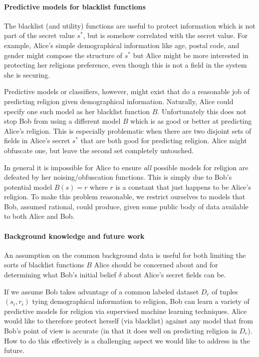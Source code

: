 \documentclass{article} %
\newcommand{\asecret}[0]{s}
\newcommand{\rsecret}[0]{\asecret^*}
\theoremstyle{plain} %
\theoremstyle{definition} %
\begin{document}
\paragraph*{Predictive models for blacklist functions} The blacklist
(and utility) functions are useful to protect information which is not
part of the secret value $ \rsecret $, but is somehow correlated with
the secret value. For example, Alice's simple demographical
information like age, postal code, and gender might compose the
structure of $ \rsecret $ but Alice might be more interested in
protecting her religions preference, even though this is not a field
in the system she is securing.

Predictive models or classifiers, however, might exist that do a
reasonable job of predicting religion given demographical
information. Naturally, Alice could specify one such model as her
blacklist function $ B $. Unfortunately this does not stop Bob from
using a different model $ B $ which is as good or better at predicting
Alice's religion. This is especially problematic when there are two
disjoint sets of fields in Alice's secret $ \rsecret $ that are both
good for predicting religion. Alice might obfuscate one, but leave the
second set completely untouched.

In general it is impossible for Alice to ensure \emph{all} possible
models for religion are defeated by her noising/obfuscation
functions. This is simply due to Bob's potential model $ B(s) = r $
where $ r $ is a constant that just happens to be Alice's religion. To
make this problem reasonable, we restrict ourselves to models that
Bob, assumed rational, could produce, given some public body of data
available to both Alice and Bob.

\paragraph*{Background knowledge and future work} An assumption on the common
background data is useful for both limiting the sorts of blacklist
functions $ B $ Alice should be concerned about and for determining
what Bob's initial belief $ \delta $ about Alice's secret fields can
be.

If we assume Bob takes advantage of a common labeled dataset $ D_r $
of tuples $ (s_i, r_i) $ tying demographical information to religion,
Bob can learn a variety of predictive models for religion via
supervised machine learning techniques. Alice would like to therefore
protect herself (via blacklist) against any model that from Bob's
point of view is accurate (in that it does well on predicting religion
in $ D_r $). How to do this effectively is a challenging aspect we
would like to address in the future.
\end{document}
